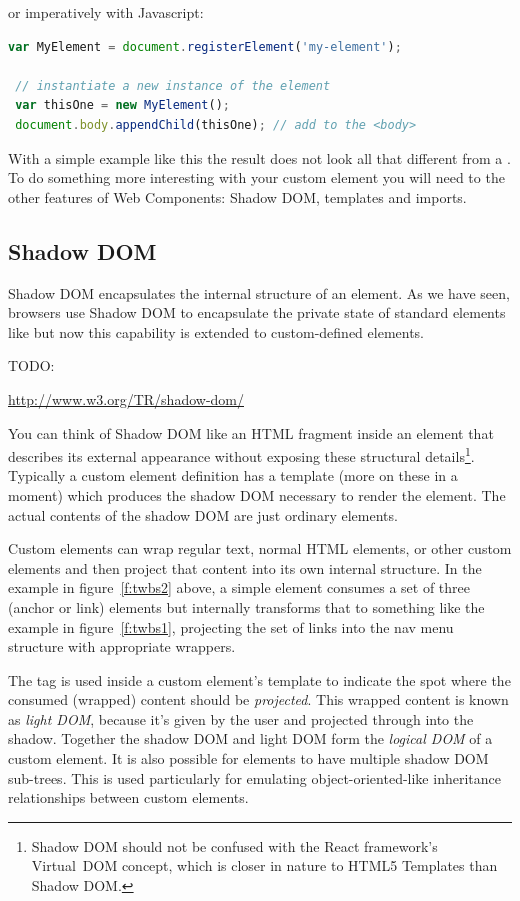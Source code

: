or imperatively with Javascript:

\begin{lstlisting}[language=JavaScript,numbers=none]
 var MyElement = document.registerElement('my-element');

 // instantiate a new instance of the element
 var thisOne = new MyElement();      
 document.body.appendChild(thisOne); // add to the <body>
\end{lstlisting}

With a simple example like this the result does not look all that different from a .
To do something more interesting with your custom element you will need to the other features of Web Components: Shadow DOM, templates and imports.

\subsection{Shadow DOM}
Shadow DOM encapsulates the internal structure of an element. 
As we have seen, browsers use Shadow DOM to encapsulate the private state of standard elements like  but now this capability is extended to custom-defined elements.

TODO: 

\url{http://www.w3.org/TR/shadow-dom/}

You can think of Shadow DOM like an HTML fragment inside an element that describes its external appearance without exposing these structural details\footnote{
Shadow DOM should not be confused with the React framework's Virtual~DOM concept, which is closer in nature to HTML5 Templates than Shadow DOM.
}. Typically a custom element definition has a template (more on these in a moment) which produces the shadow DOM necessary to render the element.
The actual contents of the shadow DOM are just ordinary elements.

Custom elements can wrap regular text, normal HTML elements, or other custom elements and then project that content into its own internal structure.
In the example in figure~\ref{f:twbs2} above, a simple  element consumes a set of three  (anchor or link) elements
but internally transforms that to something like the example in figure~\ref{f:twbs1}, 
projecting the set of links into the nav menu structure with appropriate wrappers.

The  tag is used inside a custom element's template to indicate the spot where the consumed (wrapped) content should be \textit{projected}. 
This wrapped content is known as \textit{light DOM}, because it's given by the user and projected through into the shadow.
Together the shadow DOM and light DOM form the \textit{logical DOM} of a custom element.
It is also possible for elements to have multiple shadow DOM sub-trees. 
This is used particularly for emulating object-oriented-like inheritance relationships between custom elements.

